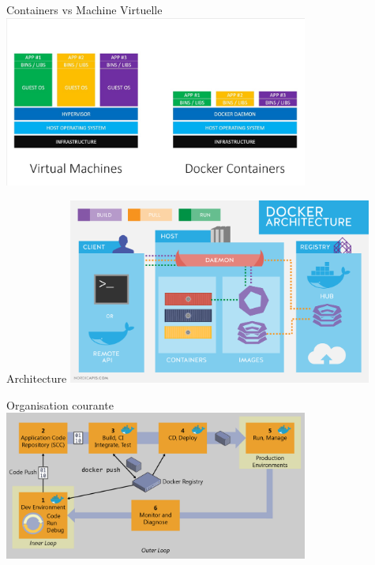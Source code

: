 \begin{frame}{Containers vs Machine Virtuelle}
    \includegraphics[width=10cm]{img/dockerVSVM.jpg}
\end{frame}

\begin{frame}{Architecture}
    \includegraphics[width=10cm]{img/architecture.png}
\end{frame}

\begin{frame}{Organisation courante}
    \includegraphics[width=10cm]{img/docker_process.png}
\end{frame}